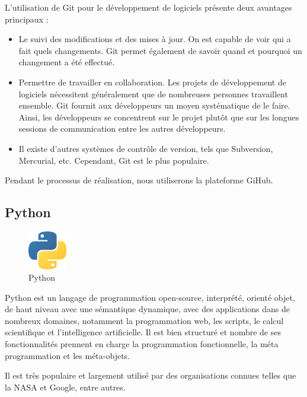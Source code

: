 L'utilisation de Git pour le développement de logiciels présente deux avantages principaux :
\begin{itemize}
    \item Le suivi des modifications et des mises à jour. On est capable de voir qui a fait quels changements. Git permet également de savoir quand et pourquoi un changement a été effectué.
    \item Permettre de travailler en collaboration. Les projets de développement de logiciels nécessitent généralement que de nombreuses personnes travaillent ensemble. Git fournit aux développeurs un moyen systématique de le faire. Ainsi, les développeurs se concentrent sur le projet plutôt que sur les longues sessions de communication entre les autres développeurs.
    \item Il existe d'autres systèmes de contrôle de version, tels que Subversion, Mercurial, etc. Cependant, Git est le plus populaire.
\end{itemize}

Pendant le processus de réalisation, nous utiliserons la plateforme GiHub.

\subsection*{Python}
\begin{figure} %
    \centering
    \includegraphics[width=0.15\textwidth]{Figures/python.png}
    \caption{Python}
\end{figure}
Python est un langage de programmation open-source, interprété, orienté objet, de haut niveau avec une sémantique dynamique, avec des applications dans de nombreux domaines, notamment la programmation web, les scripts, le calcul scientifique et l'intelligence artificielle. Il est bien structuré et nombre de ses fonctionnalités prennent en charge la programmation fonctionnelle, la méta programmation et les méta-objets.

Il est très populaire et largement utilisé par des organisations connues telles que la NASA et Google, entre autres.


